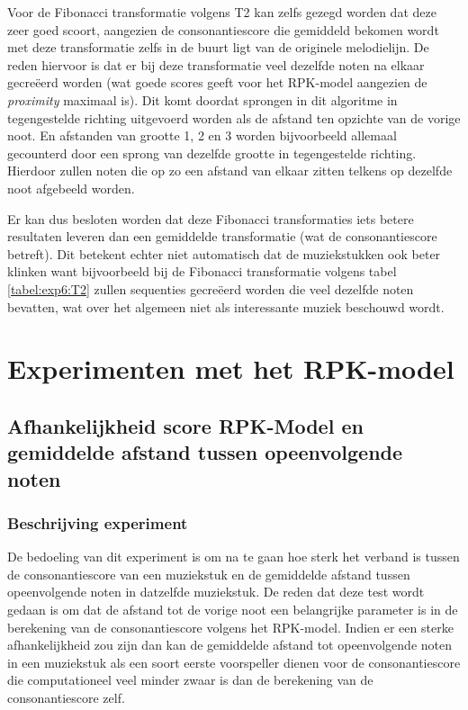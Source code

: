 Voor de Fibonacci transformatie volgens T2 kan zelfs gezegd worden dat deze zeer goed scoort, aangezien de consonantiescore die gemiddeld bekomen wordt met deze transformatie zelfs in de buurt ligt van de originele melodielijn. De reden hiervoor is dat er bij deze transformatie veel dezelfde noten na elkaar gecre\"eerd worden (wat goede scores geeft voor het RPK-model aangezien de \textit{proximity} maximaal is). Dit komt doordat sprongen in dit algoritme in tegengestelde richting uitgevoerd worden als de afstand ten opzichte van de vorige noot. En afstanden van grootte 1, 2 en 3 worden bijvoorbeeld allemaal gecounterd door een sprong van dezelfde grootte in tegengestelde richting. Hierdoor zullen noten die op zo een afstand van elkaar zitten telkens op dezelfde noot afgebeeld worden.

Er kan dus besloten worden dat deze Fibonacci transformaties iets betere resultaten leveren dan een gemiddelde transformatie (wat de consonantiescore betreft). Dit betekent echter niet automatisch dat de muziekstukken ook beter klinken want bijvoorbeeld bij de Fibonacci transformatie volgens tabel \ref{tabel:exp6:T2} zullen sequenties gecre\"eerd worden die veel dezelfde noten bevatten, wat over het algemeen niet als interessante muziek beschouwd wordt.

\section{Experimenten met het RPK-model}
\subsection{Afhankelijkheid score RPK-Model en gemiddelde afstand tussen opeenvolgende noten}
\label{experiment:10}
\subsubsection{Beschrijving experiment}
De bedoeling van dit experiment is om na te gaan hoe sterk het verband is tussen de consonantiescore van een muziekstuk en de gemiddelde afstand tussen opeenvolgende noten in datzelfde muziekstuk. De reden dat deze test wordt gedaan is om dat de afstand tot de vorige noot een belangrijke parameter is in de berekening van de consonantiescore volgens het RPK-model. Indien er een sterke afhankelijkheid zou zijn dan kan de gemiddelde afstand tot opeenvolgende noten in een muziekstuk als een soort eerste voorspeller dienen voor de consonantiescore die computationeel veel minder zwaar is dan de berekening van de consonantiescore zelf.

